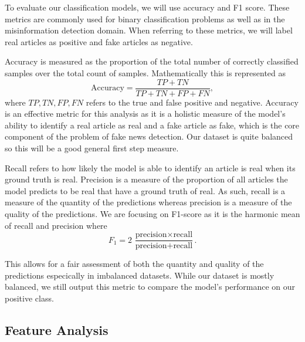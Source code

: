 \documentclass{article}
\begin{document}
\label{section:eval}

To evaluate our classification models, we will use accuracy and F1 score. These metrics are commonly used for binary classification problems as well as in the misinformation detection domain. When referring to these metrics, we will label real articles as positive and fake articles as negative.

Accuracy is measured as the proportion of the total number of correctly classified samples over the total count of samples. Mathematically this is represented as
$$\text{Accuracy} = \frac{TP + TN}{TP + TN + FP + FN},$$
where $TP,TN,FP,FN$ refers to the true and false positive and negative. Accuracy is an effective metric for this analysis as it is a holistic measure of the model's ability to identify a real article as real and a fake article as fake, which is the core component of the problem of fake news detection.
Our dataset is quite balanced so this will be a good general first step measure.

Recall refers to how likely the model is able to identify an article is real when its ground truth is real. Precision is a measure of the proportion of all articles the model predicts to be real that have a ground truth of real. As such, recall is a measure of the quantity of the predictions whereas precision is a measure of the quality of the predictions. We are focusing on F1-score as it is the harmonic mean of recall and precision where
$$F_1 = 2\,\frac{\text{precision}\times\text{recall}}{\text{precision}+\text{recall}}.$$

This allows for a fair assessment of both the quantity and quality of the predictions especically in imbalanced datasets. While our dataset is mostly balanced, we still output this metric to compare the model's performance on our positive class.

\label{section:results-discussion}

\subsection{Feature Analysis}
\end{document}

